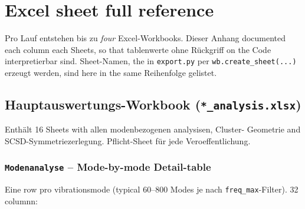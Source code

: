 \documentclass[11pt,a4paper,twoside]{article}
\theoremstyle{remark}
\begin{document}
\section{Excel sheet full reference}
\label{app:sheet-referenz}

Pro Lauf entstehen bis zu \emph{four} Excel-Workbooks. Dieser Anhang
documented each column each Sheets, so that tablenwerte ohne
R\"uckgriff on the Code interpretierbar sind. Sheet-Namen, the in
\texttt{export.py} per \texttt{wb.create\_sheet(...)} erzeugt werden,
sind here in the same Reihenfolge gelistet.

\subsection{Hauptauswertungs-Workbook (\texttt{*\_analysis.xlsx})}
\label{app:wb-hauptauswertung}

Enth\"alt 16 Sheets with allen modenbezogenen analysisen, Cluster-
Geometrie and SCSD-Symmetriezerlegung. Pflicht-Sheet f\"ur jede
Veroeffentlichung.

\subsubsection*{\texttt{Modenanalyse} -- Mode-by-mode Detail-table}

Eine row pro vibrationsmode (typical 60--800 Modes je nach
\texttt{freq\_max}-Filter). 32 columnn:
\end{document}
